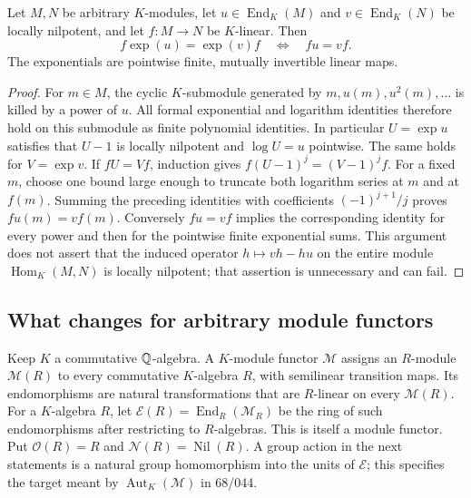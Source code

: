 \begin{theorem}\label{C-intertwine}
Let $M,N$ be arbitrary $K$-modules, let $u\in\operatorname{End}_K(M)$ and
$v\in\operatorname{End}_K(N)$ be locally nilpotent, and let $f:M\to N$ be
$K$-linear. Then
\[
 f\exp(u)=\exp(v)f\quad\Longleftrightarrow\quad fu=vf.
\]
The exponentials are pointwise finite, mutually invertible linear maps.
\end{theorem}
\begin{proof}
For $m\in M$, the cyclic $K$-submodule generated by
$m,u(m),u^2(m),\ldots$ is killed by a power of $u$.
All formal exponential and logarithm identities therefore hold on this
submodule as finite polynomial identities. In particular
$U=\exp u$ satisfies that $U-1$ is locally nilpotent and
$\log U=u$ pointwise. The same holds for $V=\exp v$.
If $fU=Vf$, induction gives $f(U-1)^j=(V-1)^jf$. For a fixed $m$, choose
one bound large enough to truncate both logarithm series at $m$ and at
$f(m)$. Summing the preceding identities with coefficients
$(-1)^{j+1}/j$ proves $fu(m)=vf(m)$. Conversely $fu=vf$ implies the
corresponding identity for every power and then for the pointwise finite
exponential sums. This argument does not assert that the induced operator
$h\mapsto vh-hu$ on the entire module $\operatorname{Hom}_K(M,N)$ is
locally nilpotent; that assertion is unnecessary and can fail.
\end{proof}

\subsection{What changes for arbitrary module functors}
Keep $K$ a commutative ${\mathbb{Q}}$-algebra.
A $K$-module functor $\mathcal M$ assigns an $R$-module $\mathcal M(R)$ to
every commutative $K$-algebra $R$, with semilinear transition maps. Its
endomorphisms are natural transformations that are $R$-linear on every
$\mathcal M(R)$. For a $K$-algebra $R$, let
$\mathscr E(R)=\operatorname{End}_{R}(\mathcal M_R)$ be the ring of such
endomorphisms after restricting to $R$-algebras. This is itself a module
functor. Put $\mathcal O(R)=R$ and $\mathcal N(R)=\operatorname{Nil}(R)$.
A group action in the next statements is a natural group homomorphism
into the units of $\mathscr E$; this specifies the target meant by
$\operatorname{Aut}_K(\mathcal M)$ in 68/044.

